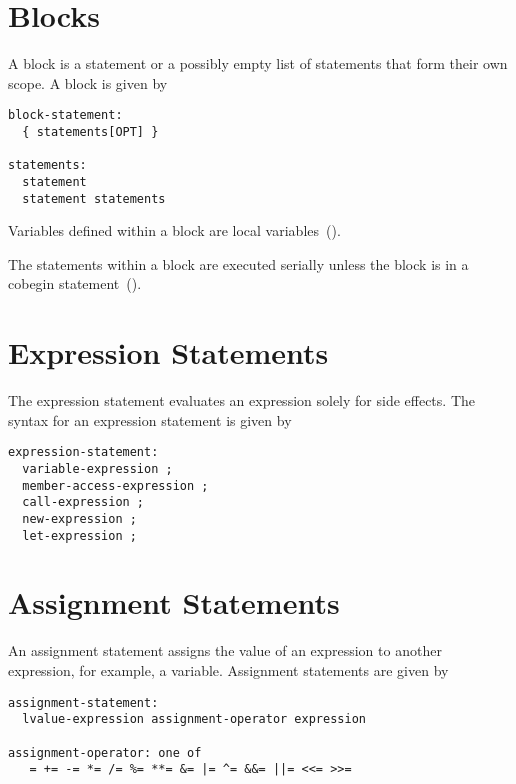 \section{Blocks}
\label{Blocks}

A block is a statement or a possibly empty list of statements that
form their own scope.  A block is given by
\begin{syntax}
\begin{verbatim}
block-statement:
  { statements[OPT] }

statements:
  statement
  statement statements
\end{verbatim}
\end{syntax}

Variables defined within a block are local
variables~().

The statements within a block are executed serially unless the block
is in a cobegin statement~().

\section{Expression Statements}
\label{Expression_Statements}
The expression statement evaluates an expression solely for side
effects. The syntax for an expression statement is given by
\begin{syntax}
\begin{verbatim}
expression-statement:
  variable-expression ;
  member-access-expression ;
  call-expression ;
  new-expression ;
  let-expression ;
\end{verbatim}
\end{syntax}

\section{Assignment Statements}
\label{Assignment_Statements}

An assignment statement assigns the value of an expression to another
expression, for
example, a variable.  Assignment statements are given by

\begin{syntax}
\begin{verbatim}
assignment-statement:
  lvalue-expression assignment-operator expression

assignment-operator: one of
   = += -= *= /= %= **= &= |= ^= &&= ||= <<= >>=
\end{verbatim}
\end{syntax}

